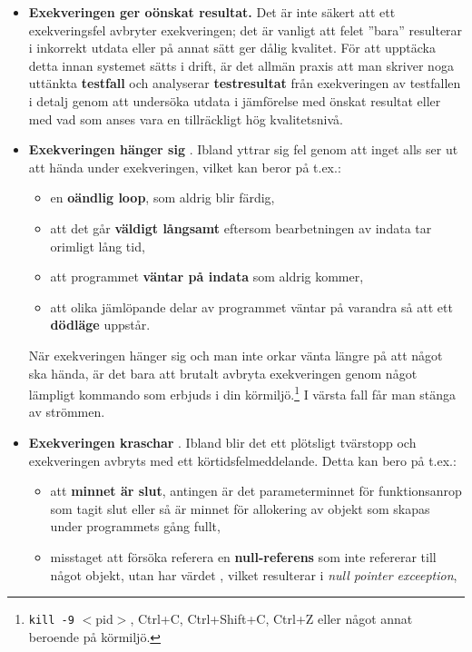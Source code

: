 \begin{itemize}
\begin{itemize}

\item \textbf{Exekveringen ger oönskat resultat.} Det är inte säkert att ett exekveringsfel avbryter exekveringen; det är vanligt att felet ''bara'' resulterar i inkorrekt utdata eller på annat sätt ger dålig kvalitet. För att upptäcka detta innan systemet sätts i drift, är det allmän praxis att man skriver noga uttänkta \textbf{testfall} och analyserar \textbf{testresultat} från exekveringen av  testfallen i detalj genom att undersöka utdata i jämförelse med önskat resultat eller med vad som anses vara en tillräckligt hög kvalitetsnivå.

\item \textbf{Exekveringen hänger sig} . Ibland yttrar sig fel genom att inget alls ser ut att hända under exekveringen, vilket kan beror på t.ex.:  
\begin{itemize}[nolistsep]
\item en \textbf{oändlig loop}, som aldrig blir färdig, 
\item att det går \textbf{väldigt långsamt} eftersom bearbetningen av indata tar orimligt lång tid,
\item att programmet \textbf{väntar på indata} som aldrig kommer,
\item att olika jämlöpande delar av programmet väntar på varandra så att ett \textbf{dödläge}  uppstår. 
\end{itemize}

När exekveringen hänger sig och man inte orkar vänta längre på att något ska hända, är det bara att brutalt avbryta exekveringen genom något lämpligt kommando som erbjuds i din körmiljö.\footnote{\texttt{kill -9} $<$pid$>$, Ctrl+C, Ctrl+Shift+C, Ctrl+Z eller något annat beroende på körmiljö.} I värsta fall får man stänga av strömmen.

\item \textbf{Exekveringen kraschar} . Ibland blir det ett plötsligt tvärstopp och exekveringen avbryts med ett körtidsfelmeddelande. Detta kan bero på t.ex.:
\begin{itemize}[nolistsep]
\item att \textbf{minnet är slut}, antingen är det parameterminnet för funktionsanrop  som tagit slut eller så är minnet för allokering av objekt som skapas under programmets gång  fullt,
 
\item misstaget att försöka referera en \textbf{null-referens} som inte refererar till något objekt, utan har värdet , vilket resulterar i  \textit{null pointer exceeption},


\end{itemize}
\end{itemize}
\end{itemize}
